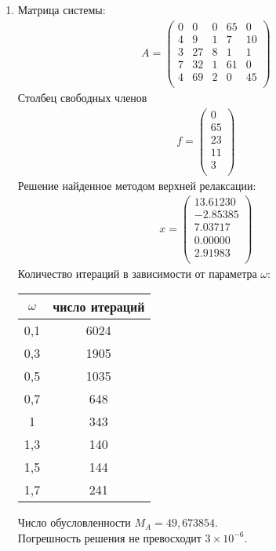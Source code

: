 \documentclass[a4paper,12pt,titlepage,finall]{article}
\begin{document}
\begin{enumerate}
\item
Матрица системы:
\begin{align*}
A = \begin{pmatrix}
0&     0&     0&    65&     0 \\
   4&     9&     1&     7&    10 \\
   3&    27&     8&     1&     1 \\
   7&    32&     1&    61&     0 \\
   4&    69&     2&     0&    45 \\
\end{pmatrix}
\end{align*}
Столбец свободных членов
\begin{align*}
f = \begin{pmatrix}
   0 \\
  65 \\
  23 \\
  11 \\
   3 \\
\end{pmatrix}
\end{align*}
Решение найденное методом верхней релаксации:
\begin{align*}
x = \begin{pmatrix}
13.61230 \\
  -2.85385 \\
   7.03717 \\
   0.00000 \\
   2.91983 \\
\end{pmatrix}
\end{align*}
Количество итераций в зависимости от параметра $\omega$:
\begin{center}
\begin{tabular}{|c|c|}
\hline
$\omega$ & число итераций\\
\hline
0,1 & 6024\\
0,3 & 1905\\
0,5 & 1035\\
0,7 & 648\\
 1 & 343\\
 1,3 & 140\\
 1,5 & 144\\
 1,7 & 241\\
 \hline
\end{tabular}
\end{center}

Число обусловленности $M_A = 49,673854$.\\
Погрешность решения не превосходит $3 \times 10^{-6}$.


\end{enumerate}
\end{document}
